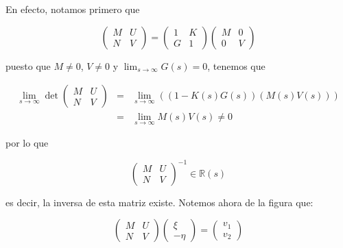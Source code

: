         En efecto, notamos primero que

        \begin{equation*}
            \begin{pmatrix}
                M & U \\
                N & V
            \end{pmatrix} =
            \begin{pmatrix}
                1 & K \\
                G & 1
            \end{pmatrix}
            \begin{pmatrix}
                M & 0 \\
                0 & V
            \end{pmatrix}
        \end{equation*}

        puesto que $M \ne 0$, $V \ne 0$ y $\lim_{s \to \infty} G(s) = 0$, tenemos que

        \begin{eqnarray*}
            \lim_{s \to \infty} \det{
            \begin{pmatrix}
                M & U \\
                N & V
            \end{pmatrix}
            } & = & \lim_{s \to \infty} \left( \left( 1 - K(s) G(s) \right) \left( M(s) V(s) \right) \right) \\
            & = & \lim_{s \to \infty} M(s) V(s) \ne 0
        \end{eqnarray*}

        por lo que

        \begin{equation*}
            \begin{pmatrix}
                M & U \\
                N & V
            \end{pmatrix}^{-1} \in \mathbb{R}(s)
        \end{equation*}

        es decir, la inversa de esta matriz existe.
        Notemos ahora de la figura que:

        \begin{equation*}
            \begin{pmatrix}
                M & U \\
                N & V
            \end{pmatrix}
            \begin{pmatrix}
                \xi \\
                - \eta
            \end{pmatrix} =
            \begin{pmatrix}
                v_1 \\
                v_2
            \end{pmatrix}
        \end{equation*}

